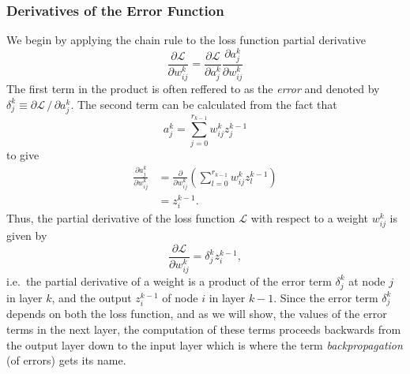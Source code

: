 \documentclass[../main.tex]{subfiles}
\begin{document}
\subsubsection{Derivatives of the Error Function}
We begin by applying the chain rule to the loss function partial derivative
%
\begin{equation}
  \frac{\partial \mathcal{L}}{\partial w_{ij}^{k}} = \frac{\partial \mathcal{L}}{\partial a_{j}^{k}} 
    \frac{\partial a_{j}^{k}}{\partial w_{ij}^{k}}
\end{equation}
%
The first term in the product is often reffered to as the \emph{error} and denoted by $\delta_{j}^{k} \equiv
\partial \mathcal{L}\,/\,\partial a_{j}^{k}$.
%
The second term can be calculated from the fact that
%
\begin{equation}
  a_{j}^{k} = \sum_{j=0}^{r_{k-1}} w_{ij}^{k} z_{j}^{k-1}
\end{equation}
%
to give
%
\begin{align}
  \frac{\partial a_{j}^{k}}{\partial w_{ij}^{k}}
  &= \frac{\partial}{\partial w_{ij}^{k}}{\left(\sum_{l=0}^{r_{k-1}} w_{ij}^{k} z_{l}^{k-1}\right)}\\
  &= z_{i}^{k-1}.
\end{align}
%
Thus, the partial derivative of the loss function $\mathcal{L}$ with respect to a weight $w_{ij}^{k}$ is given by
%
\begin{equation}
  \frac{\partial \mathcal{L}}{\partial w_{ij}^{k}} = \delta_{j}^{k} z_{i}^{k-1},
\end{equation}
%
i.e.\ the partial derivative of a weight is a product of the error term $\delta_{j}^{k}$ at node $j$ in layer $k$, and
the output $z_{i}^{k-1}$ of node $i$ in layer $k-1$.
%
Since the error term $\delta_{j}^{k}$ depends on both the loss function, and as we will show, the values of the error
terms in the next layer, the computation of these terms proceeds backwards from the output layer down to the input
layer which is where the term \emph{backpropagation} (of errors) gets its name.
%
\end{document}
